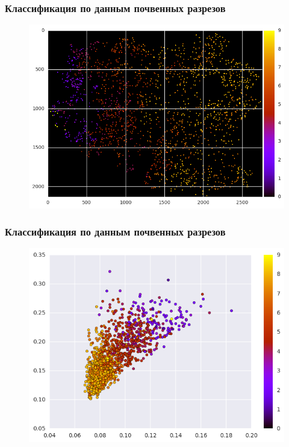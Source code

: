 \documentclass{beamer}
\begin{document}
\begin{frame}
\frametitle{Классификация по данным почвенных разрезов}
\begin{figure}[H]
\centering
\includegraphics[width=0.8\linewidth]{imgs/cuts.png}
\end{figure}
\end{frame}

\begin{frame}
\frametitle{Классификация по данным почвенных разрезов}
\begin{figure}[H]
\centering
\includegraphics[width=0.8\linewidth]{imgs/projection.png}
\end{figure}
\end{frame}
\end{document}
